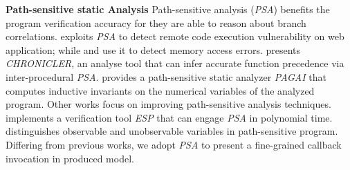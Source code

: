 \textbf{Path-sensitive static Analysis}
Path-sensitive analysis (\textit{PSA}) benefits the program verification accuracy for they are able to reason about branch correlations.
\cite{new2013path3} exploits \textit{PSA} to detect remote code execution vulnerability on web application; while \cite{new2003path2} and \cite{new2005path6} use it to detect memory access errors. \cite{new2007path7} presents \textit{CHRONICLER}, an analyse tool that can infer accurate function precedence via inter-procedural \textit{PSA}. \cite{new2012path4} provides a path-sensitive static analyzer \textit{PAGAI} that computes inductive invariants on the numerical variables of the analyzed program.
Other works focus on improving path-sensitive analysis techniques. \cite{new2002path1} implements a verification tool \textit{ESP} that can engage \textit{PSA} in polynomial time. \cite{new2008path5} distinguishes observable and unobservable variables in path-sensitive program. Differing from previous works, we adopt \textit{PSA} to present a fine-grained callback invocation in produced model.

